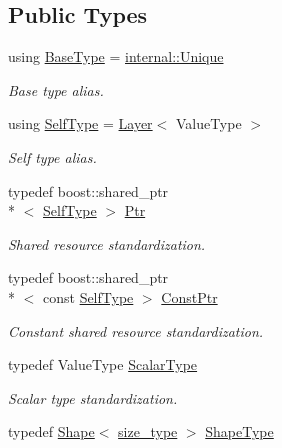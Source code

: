 \subsection*{Public Types}
\begin{DoxyCompactItemize}
\item 
using \hyperlink{classffnn_1_1layer_1_1_layer_a8946a9a8641a2760394238ce836b7df4}{Base\-Type} = \hyperlink{classffnn_1_1internal_1_1_unique}{internal\-::\-Unique}
\begin{DoxyCompactList}\small\item\em Base type alias. \end{DoxyCompactList}\item 
using \hyperlink{classffnn_1_1layer_1_1_layer_a01db5ce644b97af72dca31a759aa33c5}{Self\-Type} = \hyperlink{classffnn_1_1layer_1_1_layer}{Layer}$<$ Value\-Type $>$
\begin{DoxyCompactList}\small\item\em Self type alias. \end{DoxyCompactList}\item 
typedef boost\-::shared\-\_\-ptr\\*
$<$ \hyperlink{classffnn_1_1layer_1_1_layer_a01db5ce644b97af72dca31a759aa33c5}{Self\-Type} $>$ \hyperlink{classffnn_1_1layer_1_1_layer_ac7c8ad3ab68dbb629077e9ace21871dc}{Ptr}
\begin{DoxyCompactList}\small\item\em Shared resource standardization. \end{DoxyCompactList}\item 
typedef boost\-::shared\-\_\-ptr\\*
$<$ const \hyperlink{classffnn_1_1layer_1_1_layer_a01db5ce644b97af72dca31a759aa33c5}{Self\-Type} $>$ \hyperlink{classffnn_1_1layer_1_1_layer_adc3e5427239b7ce83615364d859ef449}{Const\-Ptr}
\begin{DoxyCompactList}\small\item\em Constant shared resource standardization. \end{DoxyCompactList}\item 
typedef Value\-Type \hyperlink{classffnn_1_1layer_1_1_layer_a3d482813f86f1ec69554b4592c478c32}{Scalar\-Type}
\begin{DoxyCompactList}\small\item\em Scalar type standardization. \end{DoxyCompactList}\item 
typedef \hyperlink{structffnn_1_1layer_1_1_shape}{Shape}$<$ \hyperlink{namespaceffnn_a63b90a2fd70eb76684eac482a51633e5}{size\-\_\-type} $>$ \hyperlink{classffnn_1_1layer_1_1_layer_ae2f2d0063ab4b2c2a3a6ebf81f4ec32f}{Shape\-Type}

\end{DoxyCompactItemize}
